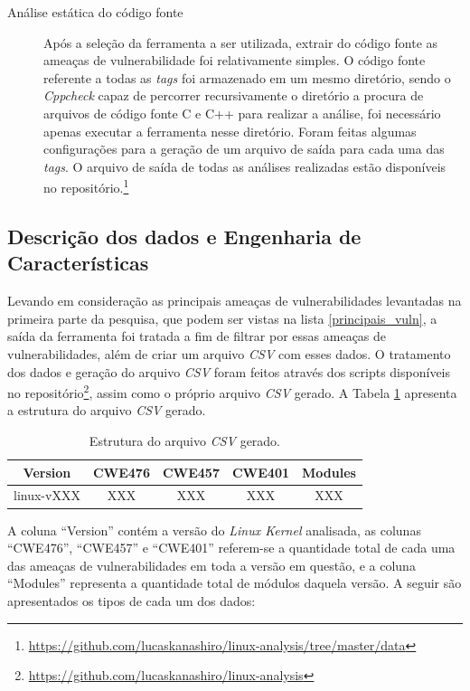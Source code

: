 \begin{description}
\item[Análise estática do código fonte]

Após a seleção da ferramenta a ser utilizada, extrair do código fonte as
ameaças de vulnerabilidade foi relativamente simples. O código fonte referente a
todas as \textit{tags} foi armazenado em um mesmo diretório, sendo o
\textit{Cppcheck} capaz de percorrer recursivamente o diretório a procura de
arquivos de código fonte C e C++ para realizar a análise, foi necessário apenas
executar a ferramenta nesse diretório. Foram feitas algumas configurações para a
geração de um arquivo de saída para cada uma das \textit{tags}. O arquivo de
saída de todas as análises realizadas estão disponíveis no
repositório.\footnote{\url{https://github.com/lucaskanashiro/linux-analysis/tree/master/data}}

\end{description}

\subsection{Descrição dos dados e Engenharia de Características}

Levando em consideração as principais ameaças de vulnerabilidades levantadas na
primeira parte da pesquisa, que podem ser vistas na lista \ref{principais_vuln},
a saída da ferramenta foi tratada a fim de filtrar por essas ameaças de
vulnerabilidades, além de criar um arquivo \textit{CSV} com esses dados. O
tratamento dos dados e geração do arquivo \textit{CSV} foram feitos através dos
scripts disponíveis no
repositório\footnote{\url{https://github.com/lucaskanashiro/linux-analysis}},
assim como o próprio arquivo \textit{CSV} gerado. A Tabela \ref{tab:csv}
apresenta a estrutura do arquivo \textit{CSV} gerado.

\begin{table}[h]
\centering
\begin{tabular}{ccccc}
\hline
\rowcolor[HTML]{EFEFEF} 
{\textbf Version} & {\textbf CWE476} & {\textbf CWE457} & {\textbf CWE401} &
{\textbf Modules} \\ \hline
linux-vXXX    & XXX          & XXX          & XXX          & XXX     \\ \hline
\end{tabular}
\caption{Estrutura do arquivo \textit{CSV} gerado.}
\label{tab:csv}
\end{table}

A coluna ``Version'' contém a versão do \textit{Linux Kernel} analisada, as
colunas ``CWE476'', ``CWE457'' e ``CWE401'' referem-se a quantidade total de cada uma
das ameaças de vulnerabilidades em toda a versão em questão, e a coluna
``Modules'' representa a quantidade total de módulos daquela versão. A seguir são
apresentados os tipos de cada um dos dados:

